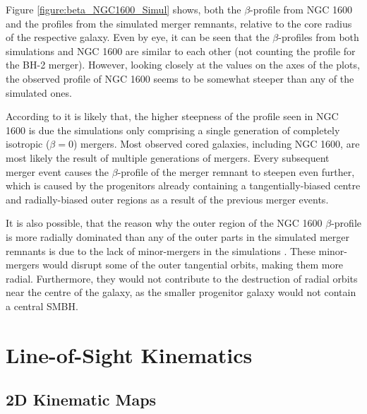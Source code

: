 \documentclass[english, oneside]{HYgradu}
\begin{document}
Figure \ref{figure:beta_NGC1600_Simul} shows, both the $\beta$-profile from NGC 1600 and the profiles from the simulated merger remnants, relative to the core radius of the respective galaxy. Even by eye, it can be seen that the $\beta$-profiles from both simulations and NGC 1600 are similar to each other (not counting the profile for the BH-2 merger). However, looking closely at the values on the axes of the plots, the observed profile of NGC 1600 seems to be somewhat steeper than any of the simulated ones.

According to \cite{Rantala2018} it is likely that, the higher steepness of the profile seen in NGC 1600 is due the simulations only comprising a single generation of completely isotropic ($\beta = 0$) mergers. Most observed cored galaxies, including NGC 1600, are most likely the result of multiple generations of mergers. Every subsequent merger event causes the $\beta$-profile of the merger remnant to steepen even further, which is caused by the progenitors already containing a tangentially-biased centre and radially-biased outer regions as a result of the previous merger events.

It is also possible, that the reason why the outer region of the NGC 1600 $\beta$-profile is more radially dominated than any of the outer parts in the simulated merger remnants is due to the lack of minor-mergers in the simulations \citep{Rantala2018}. These minor-mergers would disrupt some of the outer tangential orbits, making them more radial. Furthermore, they would not contribute to the destruction of radial orbits near the centre of the galaxy, as the smaller progenitor galaxy would not contain a central SMBH.

\section{Line-of-Sight Kinematics}

\subsection{2D Kinematic Maps}
\end{document}
